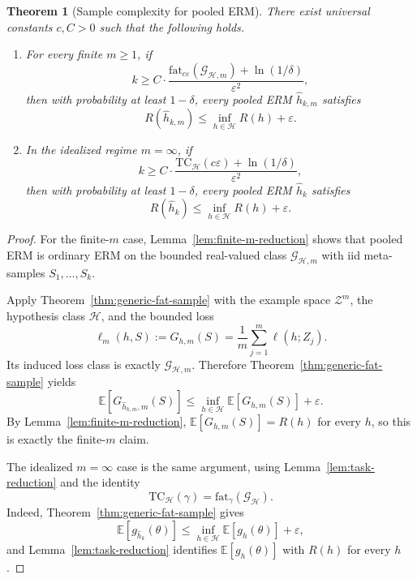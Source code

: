 \documentclass[11pt]{article}
\newtheorem{theorem}{Theorem}
\theoremstyle{definition}
\newcommand{\E}{\mathbb{E}}
\begin{document}
\begin{theorem}[Sample complexity for pooled ERM]
\label{thm:sample-complexity-pooled}
There exist universal constants $c,C > 0$ such that the following holds.

\begin{enumerate}[label=(\roman*)]
\item For every finite $m \ge 1$, if
\[
k
\ge
C \cdot \frac{\mathrm{fat}_{c\varepsilon}(\mathcal{G}_{\mathcal{H},m}) + \ln(1/\delta)}{\varepsilon^2},
\]
then with probability at least $1-\delta$, every pooled ERM $\widehat{h}_{k,m}$ satisfies
\[
R(\widehat{h}_{k,m}) \le \inf_{h \in \mathcal{H}} R(h) + \varepsilon.
\]

\item In the idealized regime $m=\infty$, if
\[
k
\ge
C \cdot \frac{\mathrm{TC}_{\mathcal{H}}(c\varepsilon) + \ln(1/\delta)}{\varepsilon^2},
\]
then with probability at least $1-\delta$, every pooled ERM $\widehat{h}_{k}$ satisfies
\[
R(\widehat{h}_{k}) \le \inf_{h \in \mathcal{H}} R(h) + \varepsilon.
\]
\end{enumerate}
\end{theorem}

\begin{proof}
For the finite-$m$ case, Lemma~\ref{lem:finite-m-reduction} shows that pooled ERM is ordinary ERM on the bounded real-valued class $\mathcal{G}_{\mathcal{H},m}$ with iid meta-samples $S_1,\dots,S_k$.

Apply Theorem~\ref{thm:generic-fat-sample} with the example space $\mathcal{Z}^m$, the hypothesis class $\mathcal{H}$, and the bounded loss
\[
\ell_m(h,S) := G_{h,m}(S) = \frac{1}{m}\sum_{j=1}^m \ell(h;Z_j).
\]
Its induced loss class is exactly $\mathcal{G}_{\mathcal{H},m}$. Therefore Theorem~\ref{thm:generic-fat-sample} yields
\[
\E[G_{\widehat h_{k,m},m}(S)]
\le
\inf_{h \in \mathcal{H}} \E[G_{h,m}(S)] + \varepsilon.
\]
By Lemma~\ref{lem:finite-m-reduction}, $\E[G_{h,m}(S)] = R(h)$ for every $h$, so this is exactly the finite-$m$ claim.

The idealized $m=\infty$ case is the same argument, using Lemma~\ref{lem:task-reduction} and the identity
\[
\mathrm{TC}_{\mathcal{H}}(\gamma) = \mathrm{fat}_{\gamma}(\mathcal{G}_{\mathcal{H}}).
\]
Indeed, Theorem~\ref{thm:generic-fat-sample} gives
\[
\E[g_{\widehat h_k}(\theta)]
\le
\inf_{h \in \mathcal{H}} \E[g_h(\theta)] + \varepsilon,
\]
and Lemma~\ref{lem:task-reduction} identifies $\E[g_h(\theta)]$ with $R(h)$ for every $h$.
\end{proof}
\end{document}
